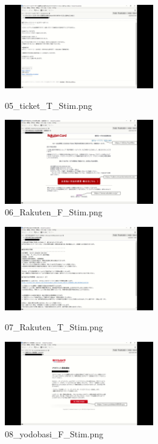 \documentclass[a4paper,11pt]{ltjsreport}
\begin{document}
\begin{figure}[H]
	\centering
	\begin{minipage}{0.45\linewidth}
		\centering
		\includegraphics[width=6.5cm]{img/stimuli/05_ticket_T_Stim.png}
		\caption{05\_ticket\_T\_Stim.png}
		\label{fig:a5}
	\end{minipage}
	\begin{minipage}{0.45\linewidth}
		\centering
		\includegraphics[width=6.5cm]{img/stimuli/06_Rakuten_F_Stim.png}
		\caption{06\_Rakuten\_F\_Stim.png}
		\label{fig:a6}
	\end{minipage}
\end{figure}

\begin{figure}[H]
	\centering
	\begin{minipage}{0.45\linewidth}
		\centering
		\includegraphics[width=6.5cm]{img/stimuli/07_Rakuten_T_Stim.png}
		\caption{07\_Rakuten\_T\_Stim.png}
		\label{fig:a7}
	\end{minipage}
	\begin{minipage}{0.45\linewidth}
		\centering
		\includegraphics[width=6.5cm]{img/stimuli/08_yodobasi_F_Stim.png}
		\caption{08\_yodobasi\_F\_Stim.png}
		\label{fig:a8}
	\end{minipage}
\end{figure}
\end{document}
